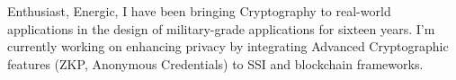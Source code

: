 
Enthusiast, Energic, I have been bringing Cryptography to real-world applications in the design of military-grade applications for sixteen years. I'm currently working on enhancing privacy by integrating Advanced Cryptographic features (ZKP, Anonymous Credentials) to SSI and blockchain frameworks.
